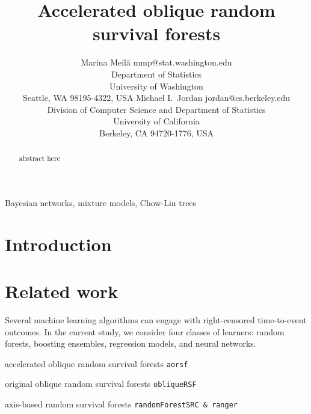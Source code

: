 \documentclass[twoside,11pt]{article}\usepackage[]{graphicx}\usepackage[]{color}
\begin{document}
\title{Accelerated oblique random survival forests}

\author{\name Marina Meil\u{a} \email mmp@stat.washington.edu \\
       \addr Department of Statistics\\
       University of Washington\\
       Seattle, WA 98195-4322, USA
       \AND
       \name Michael I.\ Jordan \email jordan@cs.berkeley.edu \\
       \addr Division of Computer Science and Department of Statistics\\
       University of California\\
       Berkeley, CA 94720-1776, USA}


\maketitle




\begin{abstract}%
abstract here
\end{abstract}

\begin{keywords}
  Bayesian networks, mixture models, Chow-Liu trees
\end{keywords}

\section{Introduction}



\section{Related work}

Several machine learning algorithms can engage with right-censored time-to-event outcomes. In the current study, we consider four classes of learners: random forests, boosting ensembles, regression models, and neural networks.

accelerated oblique random survival forests \texttt{aorsf}

original oblique random survival forests \texttt{obliqueRSF}

axis-based random survival forests \texttt{randomForestSRC \& ranger}
\end{document}
